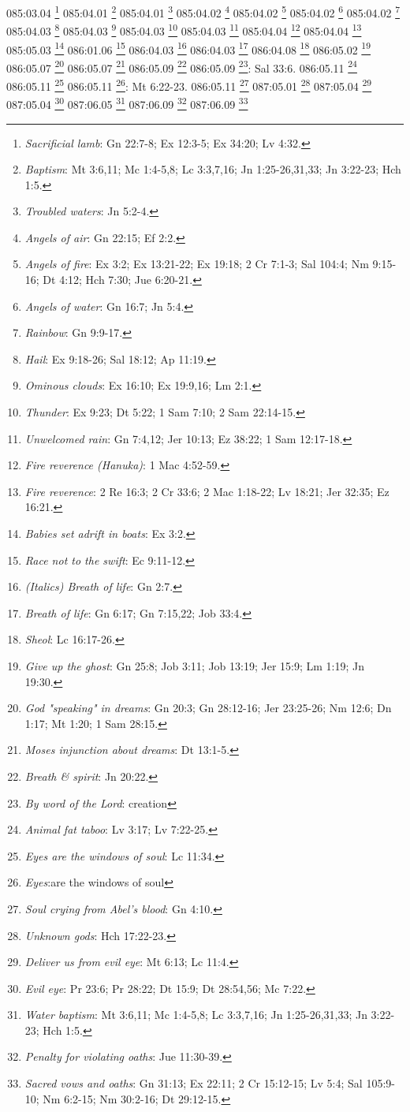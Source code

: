 {{{{{{{{{{{{{{{{{{{{{{085:03.04 \footnote{\textit{Sacrificial lamb}: Gn 22:7-8; Ex 12:3-5; Ex 34:20; Lv 4:32.}
085:04.01 \footnote{\textit{Baptism}: Mt 3:6,11; Mc 1:4-5,8; Lc 3:3,7,16; Jn 1:25-26,31,33; Jn 3:22-23; Hch 1:5.}
085:04.01 \footnote{\textit{Troubled waters}: Jn 5:2-4.}
085:04.02 \footnote{\textit{Angels of air}: Gn 22:15; Ef 2:2.}
085:04.02 \footnote{\textit{Angels of fire}: Ex 3:2; Ex 13:21-22; Ex 19:18; 2 Cr 7:1-3; Sal 104:4; Nm 9:15-16; Dt 4:12; Hch 7:30; Jue 6:20-21.}
085:04.02 \footnote{\textit{Angels of water}: Gn 16:7; Jn 5:4.}
085:04.02 \footnote{\textit{Rainbow}: Gn 9:9-17.}
085:04.03 \footnote{\textit{Hail}: Ex 9:18-26; Sal 18:12; Ap 11:19.}
085:04.03 \footnote{\textit{Ominous clouds}: Ex 16:10; Ex 19:9,16; Lm 2:1.}
085:04.03 \footnote{\textit{Thunder}: Ex 9:23; Dt 5:22; 1 Sam 7:10; 2 Sam 22:14-15.}
085:04.03 \footnote{\textit{Unwelcomed rain}: Gn 7:4,12; Jer 10:13; Ez 38:22; 1 Sam 12:17-18.}
085:04.04 \footnote{\textit{Fire reverence (Hanuka)}: 1 Mac 4:52-59.}
085:04.04 \footnote{\textit{Fire reverence}: 2 Re 16:3; 2 Cr 33:6; 2 Mac 1:18-22; Lv 18:21; Jer 32:35; Ez 16:21.}
085:05.03 \footnote{\textit{Babies set adrift in boats}: Ex 3:2.}
086:01.06 \footnote{\textit{Race not to the swift}: Ec 9:11-12.}
086:04.03 \footnote{\textit{(Italics) Breath of life}: Gn 2:7.}
086:04.03 \footnote{\textit{Breath of life}: Gn 6:17; Gn 7:15,22; Job 33:4.}
086:04.08 \footnote{\textit{Sheol}: Lc 16:17-26.}
086:05.02 \footnote{\textit{Give up the ghost}: Gn 25:8; Job 3:11; Job 13:19; Jer 15:9; Lm 1:19; Jn 19:30.}
086:05.07 \footnote{\textit{God "speaking" in dreams}: Gn 20:3; Gn 28:12-16; Jer 23:25-26; Nm 12:6; Dn 1:17; Mt 1:20; 1 Sam 28:15.}
086:05.07 \footnote{\textit{Moses injunction about dreams}: Dt 13:1-5.}
086:05.09 \footnote{\textit{Breath & spirit}: Jn 20:22.}
086:05.09 \footnote{\textit{By word of the Lord}: creation}: Sal 33:6.}
086:05.11 \footnote{\textit{Animal fat taboo}: Lv 3:17; Lv 7:22-25.}
086:05.11 \footnote{\textit{Eyes are the windows of soul}: Lc 11:34.}
086:05.11 \footnote{\textit{Eyes}:are the windows of soul}: Mt 6:22-23.}
086:05.11 \footnote{\textit{Soul crying from Abel's blood}: Gn 4:10.}
087:05.01 \footnote{\textit{Unknown gods}: Hch 17:22-23.}
087:05.04 \footnote{\textit{Deliver us from evil eye}: Mt 6:13; Lc 11:4.}
087:05.04 \footnote{\textit{Evil eye}: Pr 23:6; Pr 28:22; Dt 15:9; Dt 28:54,56; Mc 7:22.}
087:06.05 \footnote{\textit{Water baptism}: Mt 3:6,11; Mc 1:4-5,8; Lc 3:3,7,16; Jn 1:25-26,31,33; Jn 3:22-23; Hch 1:5.}
087:06.09 \footnote{\textit{Penalty for violating oaths}: Jue 11:30-39.}
087:06.09 \footnote{\textit{Sacred vows and oaths}: Gn 31:13; Ex 22:11; 2 Cr 15:12-15; Lv 5:4; Sal 105:9-10; Nm 6:2-15; Nm 30:2-16; Dt 29:12-15.}
}}}}}}}}}}}}}}}}}}}}
